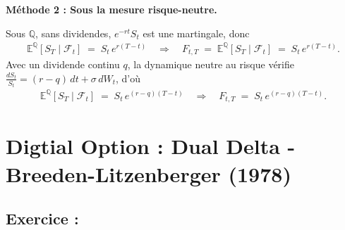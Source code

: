 \textbf{Méthode 2 : Sous la mesure risque-neutre.}

Sous $\mathbb{Q}$, sans dividendes, $e^{-rt}S_t$ est une martingale, donc
\begin{align*}
\mathbb{E}^{\mathbb{Q}}[S_T \mid \mathcal{F}_t] \;=\; S_t\,e^{r(T-t)}
\quad\Longrightarrow\quad
F_{t,T} \;=\; \mathbb{E}^{\mathbb{Q}}[S_T \mid \mathcal{F}_t]
\;=\; S_t\,e^{r(T-t)}.
\end{align*}
Avec un dividende continu $q$, la dynamique neutre au risque vérifie
$\tfrac{dS_t}{S_t}=(r-q)\,dt+\sigma\,dW_t$, d'où
\begin{align*}
\mathbb{E}^{\mathbb{Q}}[S_T \mid \mathcal{F}_t]
\;=\; S_t\,e^{(r-q)(T-t)}
\quad\Longrightarrow\quad
F_{t,T} \;=\; S_t\,e^{(r-q)(T-t)}.
\end{align*}


\section{Digtial Option : Dual Delta - Breeden-Litzenberger (1978)}

\subsection*{Exercice :}

